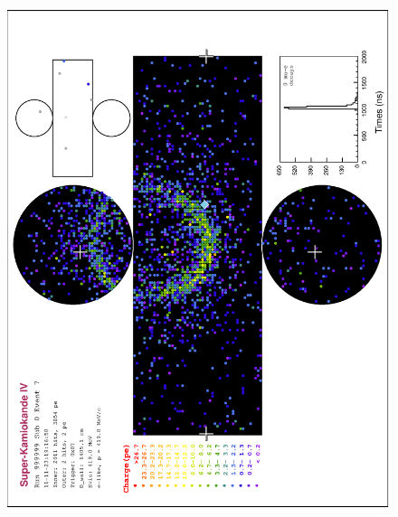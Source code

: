     \begin{figure}
          \centering
               
               \includegraphics[width=\dbfigwid\textwidth]{figures/t2k/sk-nue.eps}



\end{figure}
